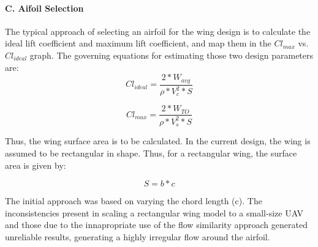 \documentclass[12pt]{article}
\begin{document}
\paragraph{C. Aifoil Selection}
The typical approach of selecting an airfoil for the wing design is to calculate the ideal lift coefficient and maximum lift coefficient, and map them in the $Cl_{max}$  vs. $Cl_{ideal}$ graph. The governing equations for estimating those two design parameters are: \\

\begin{equation}
    Cl_{ideal} = \frac{2 * W_{avg}}{\rho * V_c^2 * S}
\end{equation}  

\begin{equation}
    Cl_{max} = \frac{2 * W_{TO}}{\rho * V_s^2 * S}
\end{equation}  

\noindent %

\noindent Thus, the wing surface area is to be calculated. In the current design, the wing is assumed to be rectangular in shape. Thus, for a rectangular wing, the surface area is given by: 

\begin{equation}
    S = b * c
\end{equation}

\noindent %

\noindent The initial approach was based on varying the chord length (c). The inconsistencies present in scaling a rectangular wing model to a small-size UAV and those due to the innapropriate use of the flow similarity approach generated unreliable results, generating a highly irregular flow around the airfoil. \\
\end{document}
